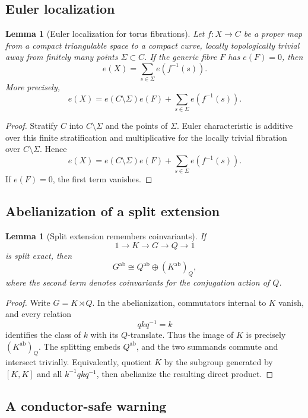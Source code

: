 \documentclass[11pt,reqno]{amsart}
\numberwithin{equation}{section}
\newtheorem{lemma}[theorem]{Lemma}
\theoremstyle{definition}
\begin{document}
\subsection{Euler localization}

\begin{lemma}[Euler localization for torus fibrations]\label{lem:euler-localization}
Let $f:X\to C$ be a proper map from a compact triangulable space to a compact curve, locally topologically trivial away from finitely many points $\Sigma\subset C$. If the generic fibre $F$ has $e(F)=0$, then
\[
e(X)=\sum_{s\in\Sigma}e(f^{-1}(s)).
\]
More precisely,
\[
e(X)=e(C\setminus\Sigma)e(F)+\sum_{s\in\Sigma}e(f^{-1}(s)).
\]
\end{lemma}

\begin{proof}
Stratify $C$ into $C\setminus\Sigma$ and the points of $\Sigma$. Euler characteristic is additive over this finite stratification and multiplicative for the locally trivial fibration over $C\setminus\Sigma$. Hence
\[
e(X)=e(C\setminus\Sigma)e(F)+\sum_{s\in\Sigma}e(f^{-1}(s)).
\]
If $e(F)=0$, the first term vanishes.
\end{proof}

\subsection{Abelianization of a split extension}

\begin{lemma}[Split extension remembers coinvariants]\label{lem:split-extension}
If
\[
1\longrightarrow K\longrightarrow G\longrightarrow Q\longrightarrow1
\]
is split exact, then
\[
G^{\mathrm{ab}}\cong Q^{\mathrm{ab}}\oplus(K^{\mathrm{ab}})_Q,
\]
where the second term denotes coinvariants for the conjugation action of $Q$.
\end{lemma}

\begin{proof}
Write $G=K\rtimes Q$. In the abelianization, commutators internal to $K$ vanish, and every relation
\[
qkq^{-1}=k
\]
identifies the class of $k$ with its $Q$-translate. Thus the image of $K$ is precisely $(K^{\mathrm{ab}})_Q$. The splitting embeds $Q^{\mathrm{ab}}$, and the two summands commute and intersect trivially. Equivalently, quotient $K$ by the subgroup generated by $[K,K]$ and all $k^{-1}qkq^{-1}$, then abelianize the resulting direct product.
\end{proof}

\subsection{A conductor-safe warning}
\end{document}
